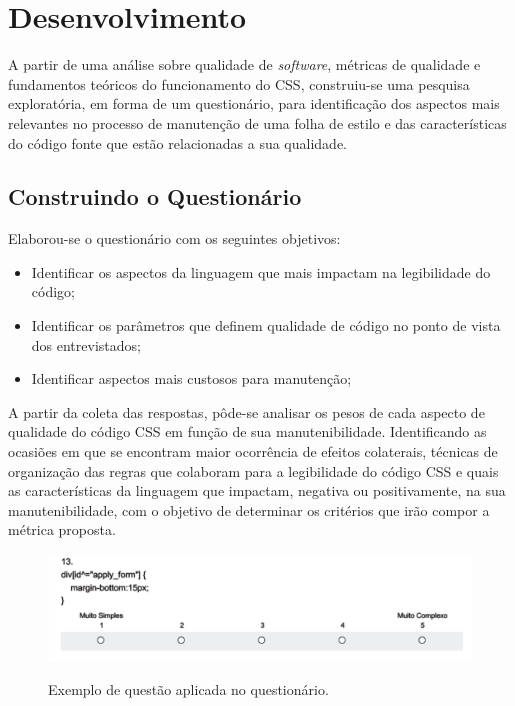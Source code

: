 \chapter{Desenvolvimento}

A partir de uma análise sobre qualidade de \textit{software}, métricas de qualidade e fundamentos teóricos do funcionamento do CSS, construiu-se uma pesquisa exploratória, em forma de um questionário, para identificação dos aspectos mais relevantes no processo de manutenção de uma folha de estilo e das características do código fonte que estão relacionadas a sua qualidade.

\section{Construindo o Questionário}
Elaborou-se o questionário com os seguintes objetivos:

\begin{itemize}
	\item Identificar os aspectos da linguagem que mais impactam na legibilidade do código;
	\item Identificar os parâmetros que definem qualidade de código no ponto de vista dos entrevistados;
	\item Identificar aspectos mais custosos para manutenção;	
\end{itemize}

A partir da coleta das respostas, pôde-se analisar os pesos de cada aspecto de qualidade do código CSS em função de sua manutenibilidade. Identificando as ocasiões em que se encontram maior ocorrência de efeitos colaterais, técnicas de organização das regras que colaboram para a legibilidade do código CSS e quais as características da linguagem que impactam, negativa ou positivamente, na sua manutenibilidade, com o objetivo de determinar os critérios que irão compor a métrica proposta.

\begin{figure}[!htb]
	\centering
	\caption{Exemplo de questão aplicada no questionário.}
	\includegraphics[width=1\textwidth]{./04-figuras/questionario_q13}
	\label{fig:questionario_q13}
\end{figure}

